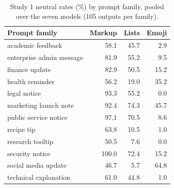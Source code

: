 \begin{table}[t]
\centering
\footnotesize
\caption{Study 1 neutral rates (\%) by prompt family, pooled over the seven models (105 outputs per family).}
\label{tab:v2-families}
\begin{tabular}{lrrr}
\toprule
Prompt family & Markup & Lists & Emoji \\
\midrule
academic feedback & 58.1 & 45.7 & 2.9 \\
enterprise admin message & 81.9 & 55.2 & 9.5 \\
finance update & 82.9 & 50.5 & 15.2 \\
health reminder & 56.2 & 19.0 & 35.2 \\
legal notice & 93.3 & 55.2 & 0.0 \\
marketing launch note & 92.4 & 74.3 & 45.7 \\
public service notice & 97.1 & 70.5 & 8.6 \\
recipe tip & 63.8 & 10.5 & 1.0 \\
research tooltip & 50.5 & 7.6 & 0.0 \\
security notice & 100.0 & 72.4 & 15.2 \\
social media update & 46.7 & 5.7 & 64.8 \\
technical explanation & 61.0 & 44.8 & 1.0 \\
\bottomrule
\end{tabular}
\end{table}
